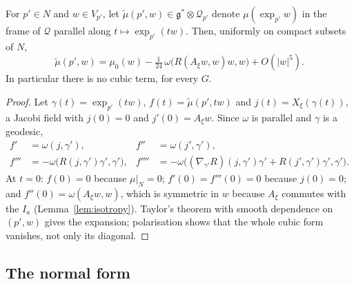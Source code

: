 \begin{lemma}\label{lem:expansion}
For $p'\in N$ and $w\in V_{p'}$, let $\widetilde\mu(p',w)\in\mathfrak g^*\otimes\mathcal Q_{p'}$
denote $\mu(\exp_{p'}w)$ in the frame of $\mathcal Q$ parallel along $t\mapsto\exp_{p'}(tw)$.
Then, uniformly on compact subsets of $N$,
\begin{equation}
 \widetilde\mu(p',w)=\mu_0(w)-\tfrac1{24}\,\omega\bigl(R(A_\xi w,w)w,w\bigr)+O(|w|^5).
 \label{eq:expansion}
\end{equation}
In particular there is no cubic term, for every $G$.
\end{lemma}

\begin{proof}
Let $\gamma(t)=\exp_{p'}(tw)$, $f(t)=\widetilde\mu(p',tw)$ and $j(t)=X_\xi(\gamma(t))$, a Jacobi
field with $j(0)=0$ and $j'(0)=A_\xi w$. Since $\omega$ is parallel and $\gamma$ is a geodesic,
\begin{align*}
 f'&=\omega(j,\gamma'), & f''&=\omega(j',\gamma'),\\
 f'''&=-\omega\bigl(R(j,\gamma')\gamma',\gamma'\bigr), &
 f''''&=-\omega\bigl((\nabla_{\gamma'}R)(j,\gamma')\gamma'+R(j',\gamma')\gamma',\gamma'\bigr).
\end{align*}
At $t=0$: $f(0)=0$ because $\mu|_N=0$; $f'(0)=f'''(0)=0$ because $j(0)=0$; and
$f''(0)=\omega(A_\xi w,w)$, which is symmetric in $w$ because $A_\xi$ commutes with the $I_a$
(Lemma~\ref{lem:isotropy}). Taylor's theorem with smooth dependence on $(p',w)$ gives the
expansion; polarisation shows that the whole cubic form vanishes, not only its diagonal.
\end{proof}

\subsection{The normal form}
\label{subsec:normal-form}

